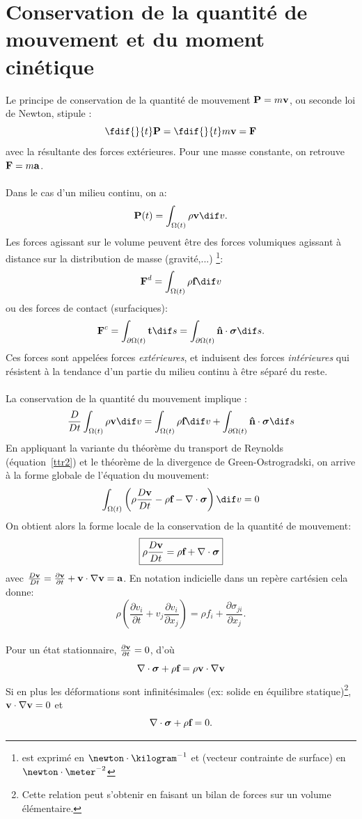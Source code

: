 \section{Conservation de la quantité de mouvement et du moment cinétique}
Le principe de conservation de la quantité de mouvement $\textbf{P}=m\textbf{v}$, ou seconde loi de Newton, stipule : $$\fdif{}{t}\fv{P}=\fdif{}{t}m\fv{v}=\fv{F}$$ avec  la résultante des forces extérieures. Pour une masse constante, on retrouve $\textbf{F}=m\textbf{a}$.
\paragraph{}
Dans le cas d'un milieu continu, on a: $$\fv{P}(t)=\int_{\Omega(t)}\rho\fv{v} \dif v.$$
Les forces agissant sur le volume peuvent être des forces volumiques agissant à distance sur la distribution de masse (gravité,...)
\footnote{ est exprimé en $\newton\cdot\kilogram^{-1}$ et  (vecteur contrainte de surface) en $\newton\cdot\meter^{-2}$}: $$\fv{F}^d=\int_{\Omega (t)}\rho\fv{f} \dif v$$  ou des forces de contact (surfaciques): $$\fv{F}^c=\int_{\partial \Omega (t)}\fv{t} \dif s=\int_{\partial \Omega (t)}\fv{\^n}\cdot\boldsymbol{\sigma} \dif s.$$ Ces forces sont appelées forces \emph{extérieures}, et induisent des forces \emph{intérieures} qui résistent à la tendance d'un partie du milieu continu à être séparé du reste.
\paragraph{}
La conservation de la quantité du mouvement implique :
$$\frac{D}{Dt}\int_{\Omega (t)}\rho\fv{v} \dif v=\int_{\Omega (t)}\rho\fv{f} \dif v+\int_{\partial\Omega (t)}\fv{\^n}\cdot\boldsymbol{\sigma} \dif s$$
En appliquant la variante du théorème du transport de Reynolds (équation~\eqref{ttr2}) et le théorème de la divergence de Green-Ostrogradski, on arrive à la forme globale de l'équation du mouvement:
$$\int_{\Omega (t)}\left(\rho\frac{D\fv{v}}{Dt}-\rho\fv{f}-\nabla\cdot\boldsymbol{\sigma}\right) \dif v=0$$
On obtient alors la forme locale de la conservation de la quantité de mouvement:
$$\boxed{\rho\frac{D\textbf{v}}{Dt}=\rho\textbf{f}+\nabla\cdot\boldsymbol{\sigma}}$$
avec $\frac{D\textbf{v}}{Dt}=\frac{\partial \textbf{v}}{\partial t}+\textbf{v}\cdot\nabla\textbf{v}=\textbf{a}$. En notation indicielle dans un repère cartésien cela donne:
$$\rho\left(\frac{\partial v_i}{\partial t}+v_j\frac{\partial v_i}{\partial x_j}\right)=\rho f_i+\frac{\partial \sigma_{ji}}{\partial x_j}.$$
\paragraph{}
Pour un état stationnaire, $\frac{\partial\textbf{v}}{\partial t}=0$, d'où $$\nabla\cdot\boldsymbol{\sigma}+\rho\textbf{f}=\rho\textbf{v}\cdot\nabla\textbf{v}$$
Si en plus les déformations sont infinitésimales (ex: solide en équilibre statique)\footnote{Cette relation peut s'obtenir en faisant un bilan de forces sur un volume élémentaire.}, $\textbf{v}\cdot\nabla\textbf{v}=0$ et
$$\nabla\cdot\boldsymbol{\sigma}+\rho\textbf{f}=0.$$

